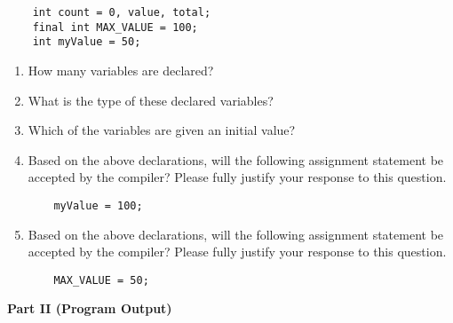 \documentclass[12pt]{article}
\begin{document}
\begin{enumerate}
\hspace*{.25in}
\begin{minipage}{6in}
  \begin{lstlisting}
    int count = 0, value, total;
    final int MAX_VALUE = 100;
    int myValue = 50;
  \end{lstlisting}
\end{minipage}

\begin{enumerate}

\item How many variables are declared?
  \vspace*{1in}

\item What is the type of these declared variables?
  \vspace*{1in}

\item Which of the variables are given an initial value?
  \vspace*{1in}

\item Based on the above declarations, will the following assignment
  statement be accepted by the compiler?  Please fully justify your
  response to this question.


\begin{minipage}{6in}
  \begin{lstlisting}
    myValue = 100;
  \end{lstlisting}
\end{minipage}
  \vspace*{1in}

\item Based on the above declarations, will the following assignment
  statement be accepted by the compiler?  Please fully justify your
  response to this question.
  

\begin{minipage}{6in}
  \begin{lstlisting}
    MAX_VALUE = 50;
  \end{lstlisting}
\end{minipage}
\vspace*{1in}

\end{enumerate}

\end{enumerate}

\noindent
{\bf Part II (Program Output)}
\end{document}
